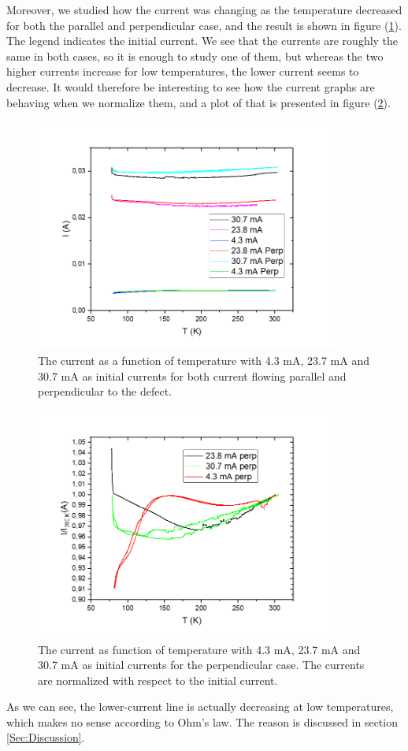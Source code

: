 \documentclass{comjnl}
\begin{document}
Moreover, we studied how the current was changing as the temperature decreased for both the parallel and perpendicular case, and the result is shown in figure (\ref{fig:cur}). The legend indicates the initial current. We see that the currents are roughly the same in both cases, so it is enough to study one of them, but whereas the two higher currents increase for low temperatures, the lower current seems to decrease. It would therefore be interesting to see how the current graphs are behaving when we normalize them, and a plot of that is presented in figure (\ref{fig:cur_norm}). 
\begin{figure}[h]
\centering
\includegraphics[width=100mm]{Bilde3.png}
\caption{The current as a function of temperature with 4.3 mA, 23.7 mA and 30.7 mA as initial currents for both current flowing parallel and perpendicular to the defect.\label{fig:cur}}
\end{figure}
\begin{figure}[h]
\centering
\includegraphics[width=100mm]{Bilde4.png}
\caption{The current as function of temperature with 4.3 mA, 23.7 mA and 30.7 mA as initial currents for the perpendicular case. The currents are normalized with respect to the initial current.\label{fig:cur_norm}}
\end{figure}
As we can see, the lower-current line is actually decreasing at low temperatures, which makes no sense according to Ohm's law. The reason is discussed in section \ref{Sec:Discussion}.
\end{document}
